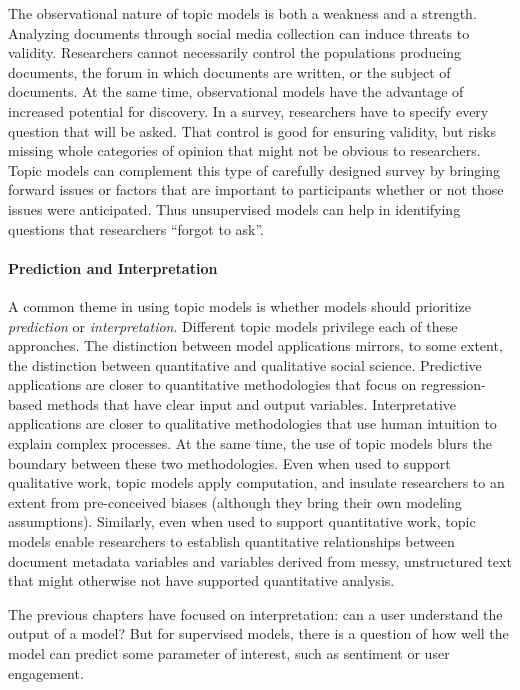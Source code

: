 The observational nature of topic models is both a weakness and a strength.
Analyzing documents through social media collection can induce threats to validity. Researchers cannot necessarily control the populations producing documents, the forum in which documents are written, or the subject of documents.
At the same time, observational models have the advantage of increased potential for discovery.
In a survey, researchers have to specify every question that will be asked.
That control is good for ensuring validity, but risks missing whole categories of opinion that might not be obvious to researchers.
Topic models can complement this type of carefully designed survey by bringing forward issues or factors that are important to participants whether or not those issues were anticipated.
Thus unsupervised models can help in identifying questions that researchers ``forgot to ask''.

\paragraph{Prediction and Interpretation}

A common theme in using topic models is whether models
should prioritize \emph{prediction} or \emph{interpretation}. 
Different topic models privilege each of  these approaches.
The distinction between model applications mirrors, to some extent,  the distinction between quantitative and qualitative social science.
Predictive applications are closer to quantitative methodologies that focus on regression-based methods that have clear input and output variables.
Interpretative applications are closer to qualitative methodologies that use human intuition to explain complex processes.
At the same time, the use of topic models blurs the boundary between these two methodologies.
Even when used to support qualitative work, topic models apply computation, and insulate researchers to an extent from pre-conceived biases (although they bring their own modeling assumptions).
Similarly, even when used to support quantitative work, topic models enable researchers to establish quantitative relationships between document metadata variables and variables derived from messy, unstructured text that might otherwise not have supported  quantitative analysis.

The previous chapters have focused on interpretation: can a user
understand the output of a model?  But for supervised models, there is
a question of how well the model can predict some parameter of interest, such as sentiment or user engagement.  

